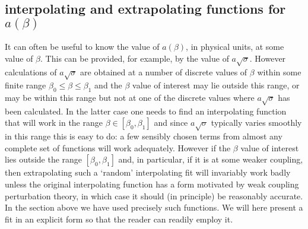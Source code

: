 \documentclass[12pt]{article}
\begin{document}
%
%
\subsection{interpolating and extrapolating functions for $a(\beta)$}
\label{subsection_interpol}

It can often be useful to know the value of $a(\beta)$, in physical  units, at some value
of $\beta$. This can be provided, for example, by the value of $a\surd\sigma$. However
calculations of $a\surd\sigma$ are obtained at a number of discrete values of $\beta$
within some finite range $\beta_0\leq\beta\leq\beta_1$ and the $\beta$ value of interest
may lie outside this range, or may be within this range but not at one of the discrete
values where  $a\surd\sigma$ has been calculated. In the latter case one needs to find an
interpolating function that will work in the range $\beta \in [\beta_0,\beta_1]$ and since
$a\surd\sigma$ typically varies smoothly in this range
this is easy to do: a few sensibly chosen terms from almost any complete set of functions
will work adequately. However if the $\beta$ value of interest lies outside the
range $[\beta_0,\beta_1]$ and, in particular, if it is at some weaker coupling, then
extrapolating such a `random' interpolating fit will invariably work badly
unless the original interpolating function has a form motivated by weak coupling
perturbation theory, in which case it should (in principle) be reasonably accurate.
In the section above we have used precisely such functions. We will here
present a fit in an explicit form so that the reader can readily employ it.
\end{document}
